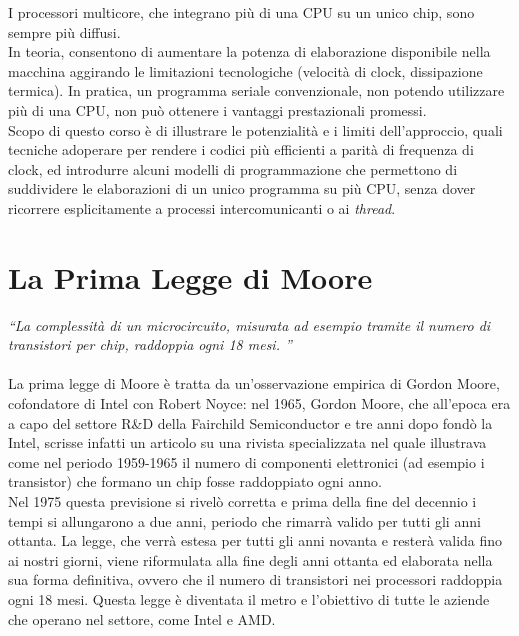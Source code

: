 I processori multicore, che integrano più di una CPU su un unico chip, sono sempre più diffusi.\\
In teoria, consentono di aumentare la potenza di elaborazione disponibile nella macchina aggirando le limitazioni tecnologiche (velocità di clock, dissipazione termica). In pratica, un programma seriale convenzionale, non potendo utilizzare più di una CPU, non può ottenere i vantaggi prestazionali promessi.\\
Scopo di questo corso è di illustrare le potenzialità e i limiti dell'approccio, quali tecniche adoperare per rendere i codici più efficienti a parità di frequenza di clock, ed introdurre alcuni modelli di programmazione che permettono di suddividere le elaborazioni di un unico programma su più CPU, senza dover ricorrere esplicitamente a processi intercomunicanti o ai \textit{thread}.

\section{La Prima Legge di Moore}
\textit{\textquotedblleft La complessità di un microcircuito, misurata ad esempio tramite il numero di transistori per chip, raddoppia ogni 18 mesi. \textquotedblright}\\\\
La prima legge di Moore è tratta da un'osservazione empirica di Gordon Moore, cofondatore di Intel con Robert Noyce: nel 1965, Gordon Moore, che all'epoca era a capo del settore R\&D della Fairchild Semiconductor e tre anni dopo fondò la Intel, scrisse infatti un articolo su una rivista specializzata nel quale illustrava come nel periodo 1959-1965 il numero di componenti elettronici (ad esempio i transistor) che formano un chip fosse raddoppiato ogni anno. \\
Nel 1975 questa previsione si rivelò corretta e prima della fine del decennio i tempi si allungarono a due anni, periodo che rimarrà valido per tutti gli anni ottanta. La legge, che verrà estesa per tutti gli anni novanta e resterà valida fino ai nostri giorni, viene riformulata alla fine degli anni ottanta ed elaborata nella sua forma definitiva, ovvero che il numero di transistori nei processori raddoppia ogni 18 mesi. Questa legge è diventata il metro e l'obiettivo di tutte le aziende che operano nel settore, come Intel e AMD.
